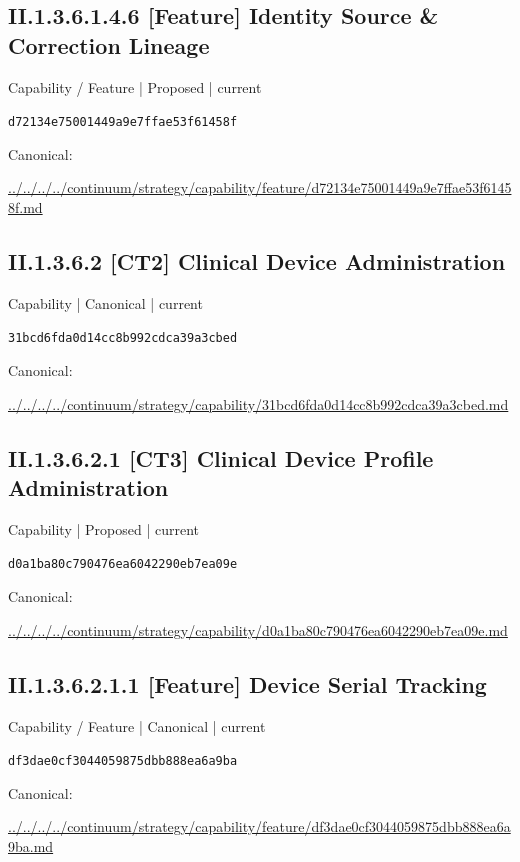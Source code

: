 \documentclass[10pt,a4paper]{article}
\begin{document}
\subsection*{II.1.3.6.1.4.6 [Feature] Identity Source \& Correction Lineage}
{\small Capability / Feature | Proposed | current}\par
\texttt{d72134e75001449a9e7ffae53f61458f}\par
Canonical: \par
{\footnotesize\url{../../../../continuum/strategy/capability/feature/d72134e75001449a9e7ffae53f61458f.md}}\par
\subsection*{II.1.3.6.2 [CT2] Clinical Device Administration}
{\small Capability | Canonical | current}\par
\texttt{31bcd6fda0d14cc8b992cdca39a3cbed}\par
Canonical: \par
{\footnotesize\url{../../../../continuum/strategy/capability/31bcd6fda0d14cc8b992cdca39a3cbed.md}}\par
\subsection*{II.1.3.6.2.1 [CT3] Clinical Device Profile Administration}
{\small Capability | Proposed | current}\par
\texttt{d0a1ba80c790476ea6042290eb7ea09e}\par
Canonical: \par
{\footnotesize\url{../../../../continuum/strategy/capability/d0a1ba80c790476ea6042290eb7ea09e.md}}\par
\subsection*{II.1.3.6.2.1.1 [Feature] Device Serial Tracking}
{\small Capability / Feature | Canonical | current}\par
\texttt{df3dae0cf3044059875dbb888ea6a9ba}\par
Canonical: \par
{\footnotesize\url{../../../../continuum/strategy/capability/feature/df3dae0cf3044059875dbb888ea6a9ba.md}}\par
\end{document}
